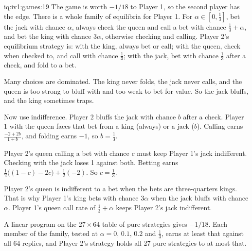 \begin{solution}{iq:iv1:games:19}
The game is worth $-1/18$ to Player 1, so the second player has the edge. There is a whole family of equilibria for Player 1. For $\alpha \in [0, \tfrac13]$, bet the jack with chance $\alpha$, always check the queen and call a bet with chance $\tfrac13 + \alpha$, and bet the king with chance $3\alpha$, otherwise checking and calling. Player 2's equilibrium strategy is: with the king, always bet or call; with the queen, check when checked to, and call with chance $\tfrac13$; with the jack, bet with chance $\tfrac13$ after a check, and fold to a bet.

Many choices are dominated. The king never folds, the jack never calls, and the queen is too strong to bluff with and too weak to bet for value. So the jack bluffs, and the king sometimes traps.

Now use indifference. Player 2 bluffs the jack with chance $b$ after a check. Player 1 with the queen faces that bet from a king (always) or a jack ($b$). Calling earns $\frac{-2 + 2b}{1 + b}$, and folding earns $-1$, so $b = \tfrac13$.

Player 2's queen calling a bet with chance $c$ must keep Player 1's jack indifferent. Checking with the jack loses 1 against both. Betting earns $\tfrac12\bigl((1 - c) - 2c\bigr) + \tfrac12(-2)$. So $c = \tfrac13$.

Player 2's queen is indifferent to a bet when the bets are three-quarters kings. That is why Player 1's king bets with chance $3\alpha$ when the jack bluffs with chance $\alpha$. Player 1's queen call rate of $\tfrac13 + \alpha$ keeps Player 2's jack indifferent.

A linear program on the $27 \times 64$ table of pure strategies gives $-1/18$. Each member of the family, tested at $\alpha = 0$, $0.1$, $0.2$ and $\tfrac13$, earns at least that against all 64 replies, and Player 2's strategy holds all 27 pure strategies to at most that.

\end{solution}

